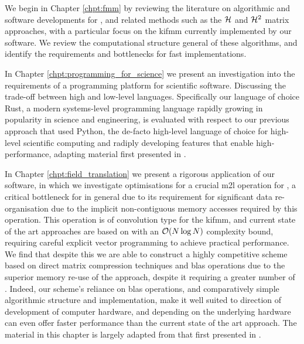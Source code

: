 We begin in Chapter \ref{chpt:fmm} by reviewing the literature on algorithmic and software developments for , and related methods such as the $\mathcal{H}$ and $\mathcal{H}^2$ matrix approaches, with a particular focus on the \acrshort{kifmm} currently implemented by our software. We review the computational structure general of these algorithms, and identify the requirements and bottlenecks for fast implementations.

In Chapter \ref{chpt:programming_for_science} we present an investigation into the requirements of a programming platform for scientific software. Discussing the trade-off between high and low-level languages. Specifically our language of choice Rust, a modern systems-level programming language rapidly growing in popularity in science and engineering, is evaluated with respect to our previous approach that used Python, the de-facto high-level language of choice for high-level scientific computing and radiply developing features that enable high-performance, adapting material first presented in \cite{kailasa2022pyexafmm}.

In Chapter \ref{chpt:field_translation} we present a rigorous application of our software, in which we investigate optimisations for a crucial \acrfull{m2l} operation for , a critical bottleneck for  in general due to its requirement for significant data re-organisation due to the implicit non-contiguous memory accesses required by this operation. This operation is of convolution type for the \acrshort{kifmm}, and current state of the art approaches are based on  with an $\mathcal{O}(N \log{N})$ complexity bound, requiring careful explicit vector programming to achieve practical performance. We find that despite this we are able to construct a highly competitive scheme based on direct matrix compression techniques and \acrfull{blas} operations due to the superior memory re-use of the approach, despite it requiring a greater number of . Indeed, our scheme's reliance on \acrshort{blas} operations, and comparatively simple algorithmic structure and implementation, make it well suited to direction of development of computer hardware, and depending on the underlying hardware can even offer faster performance than the current state of the art approach. The material in this chapter is largely adapted from that first presented in \cite{kailasa2024m2ltranslationoperatorskernel}.

